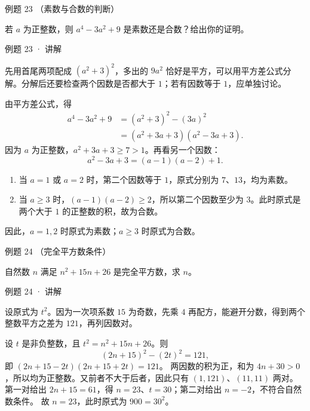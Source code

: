 
\begin{problem}{例题 23 （素数与合数的判断）}

若 $a$ 为正整数，则 $a^4-3a^2+9$ 是素数还是合数？给出你的证明。

\end{problem}


\begin{solution}{例题 23 · 讲解}

\think 先用首尾两项配成 $(a^2+3)^2$，多出的 $9a^2$ 恰好是平方，可以用平方差公式分解。分解后还要检查两个因数是否都大于 $1$；若有因数等于 $1$，应单独讨论。

\solve 由平方差公式，得
\begin{align*}
a^4-3a^2+9
&=(a^2+3)^2-(3a)^2\\
&=(a^2+3a+3)(a^2-3a+3).
\end{align*}
因为 $a$ 为正整数，$a^2+3a+3\ge7>1$。再看另一个因数：
\[a^2-3a+3=(a-1)(a-2)+1.\]
\begin{enumerate}[label=(\arabic*)]
\item 当 $a=1$ 或 $a=2$ 时，第二个因数等于 $1$，原式分别为 $7$、$13$，均为素数。
\item 当 $a\ge3$ 时，$(a-1)(a-2)\ge2$，所以第二个因数至少为 $3$。此时原式是两个大于 $1$ 的正整数的积，故为合数。
\end{enumerate}
因此，$a=1,2$ 时原式为素数；$a\ge3$ 时原式为合数。


\end{solution}


\begin{problem}{例题 24 （完全平方数条件）}

自然数 $n$ 满足 $n^2+15n+26$ 是完全平方数，求 $n$。

\end{problem}


\begin{solution}{例题 24 · 讲解}

\think 设原式为 $t^2$。因为一次项系数 $15$ 为奇数，先乘 $4$ 再配方，能避开分数，得到两个整数平方之差为 $121$，再列因数对。

\solve 设 $t$ 是非负整数，且 $t^2=n^2+15n+26$。则
\[(2n+15)^2-(2t)^2=121,\]
即 $(2n+15-2t)(2n+15+2t)=121$。
两因数的积为正，和为 $4n+30>0$，所以均为正整数。又前者不大于后者，因此只有 $(1,121)$、$(11,11)$ 两对。
第一对给出 $2n+15=61$，得 $n=23$、$t=30$；第二对给出 $n=-2$，不符合自然数条件。
故 $n=23$，此时原式为 $900=30^2$。


\end{solution}

